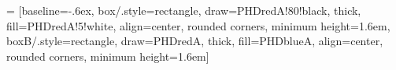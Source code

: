  = [baseline=-.6ex,
box/.style={rectangle, draw=PHDredA!80!black, thick, fill=PHDredA!5!white,
	align=center, rounded corners, minimum height=1.6em},
boxB/.style={rectangle, draw=PHDredA, thick, fill=PHDblueA,
	align=center, rounded corners, minimum height=1.6em}]